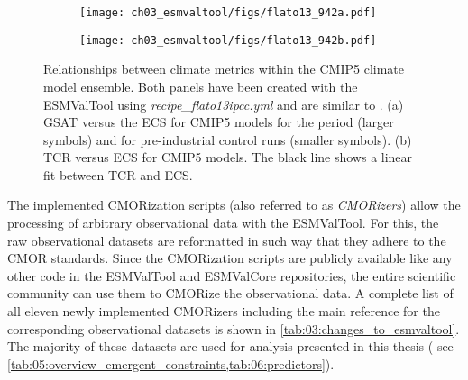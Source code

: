 \begin{figure}[t]
  \centering
  \begin{subfigure}[b]{0.36\columnwidth}
    \texttt{[image: ch03\_esmvaltool/figs/flato13\_942a.pdf]}
    \caption{}
    \label{fig:03:flato13:a}
  \end{subfigure}
  \begin{subfigure}[b]{0.36\columnwidth}
    \texttt{[image: ch03\_esmvaltool/figs/flato13\_942b.pdf]}
    \caption{}
    \label{fig:03:flato13:b}
  \end{subfigure}
  \begin{subfigure}[b]{0.26\columnwidth}
  \end{subfigure}
  \caption[
    Relationships between climate metrics within the \acs{CMIP}5 climate model
    ensemble.
  ]{
    Relationships between climate metrics within the \acs{CMIP}5 climate model
    ensemble. Both panels have been created with the \acs{ESMValTool} using
    \emph{recipe\_flato13ipcc.yml} and are similar to \textcite{Flato2013}. (a)
    \Acf{GSAT} versus the \acf{ECS} for \acs{CMIP}5 models for the period
     (larger symbols) and for pre-industrial control runs
    (smaller symbols). (b) \Acf{TCR} versus \acs{ECS} for \acs{CMIP}5 models.
    The black line shows a linear fit between \acs{TCR} and \acs{ECS}.
  }
  \label{fig:03:flato13}
\end{figure}

The implemented \acs{CMOR}ization scripts (also referred to as
\emph{\acs{CMOR}izers}) allow the processing of arbitrary observational data
with the \ac{ESMValTool}. For this, the raw observational datasets are
reformatted in such way that they adhere to the \ac{CMOR} standards. Since the
\acs{CMOR}ization scripts are publicly available like any other code in the
\ac{ESMValTool} and \ac{ESMValCore} repositories, the entire scientific
community can use them to \acs{CMOR}ize the observational data. A complete list
of all eleven newly implemented \acs{CMOR}izers including the main reference
for the corresponding observational datasets is shown in
\cref{tab:03:changes_to_esmvaltool}. The majority of these datasets are used
for analysis presented in this thesis (\eg{} see
\cref{tab:05:overview_emergent_constraints,tab:06:predictors}).
